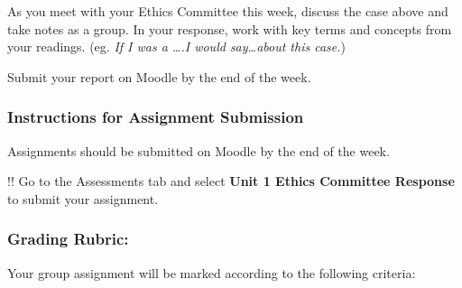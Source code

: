 \documentclass[
]{book}
\begin{document}
As you meet with your Ethics Committee this week, discuss the case above and
take notes as a group. In your response, work with key terms and concepts from
your readings. (eg. \emph{If I was a \ldots.I would say\ldots about this case.})

Submit your report on Moodle by the end of the week.

\hypertarget{instructions-for-assignment-submission}{%
\subsubsection{Instructions for Assignment Submission}\label{instructions-for-assignment-submission}}

Assignments should be submitted on Moodle by the end of the week.

!! Go to the Assessments tab and select \textbf{Unit 1 Ethics Committee Response} to submit your assignment.

\hypertarget{grading-rubric}{%
\subsubsection{Grading Rubric:}\label{grading-rubric}}

Your group assignment will be marked according to the following criteria:
\end{document}
